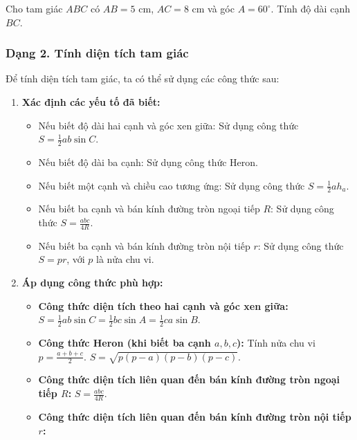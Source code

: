 \begin{vidumau}
Cho tam giác $ABC$ có $AB = 5$ cm, $AC = 8$ cm và góc $A = 60^\circ$. Tính độ dài cạnh $BC$.
\end{vidumau}

\subsubsection{Dạng 2. Tính diện tích tam giác}
\begin{phuongphap}
Để tính diện tích tam giác, ta có thể sử dụng các công thức sau:
\begin{enumerate}
    \item \textbf{Xác định các yếu tố đã biết:}
    \begin{itemize}
        \item Nếu biết độ dài hai cạnh và góc xen giữa: Sử dụng công thức $S = \frac{1}{2}ab\sin C$.
        \item Nếu biết độ dài ba cạnh: Sử dụng công thức Heron.
        \item Nếu biết một cạnh và chiều cao tương ứng: Sử dụng công thức $S = \frac{1}{2}ah_a$.
        \item Nếu biết ba cạnh và bán kính đường tròn ngoại tiếp $R$: Sử dụng công thức $S = \frac{abc}{4R}$.
        \item Nếu biết ba cạnh và bán kính đường tròn nội tiếp $r$: Sử dụng công thức $S = pr$, với $p$ là nửa chu vi.
    \end{itemize}
    \item \textbf{Áp dụng công thức phù hợp:}
    \begin{itemize}
        \item \textbf{Công thức diện tích theo hai cạnh và góc xen giữa:}
        $S = \frac{1}{2}ab\sin C = \frac{1}{2}bc\sin A = \frac{1}{2}ca\sin B$.
        \item \textbf{Công thức Heron (khi biết ba cạnh $a, b, c$):}
        Tính nửa chu vi $p = \frac{a+b+c}{2}$.
        $S = \sqrt{p(p-a)(p-b)(p-c)}$.
        \item \textbf{Công thức diện tích liên quan đến bán kính đường tròn ngoại tiếp $R$:}
        $S = \frac{abc}{4R}$.
        \item \textbf{Công thức diện tích liên quan đến bán kính đường tròn nội tiếp $r$:}

\end{itemize}
\end{enumerate}
\end{phuongphap}
